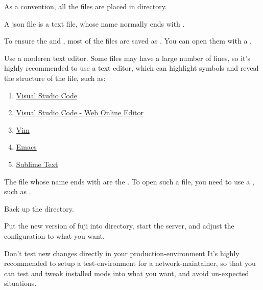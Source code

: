 \label{ch:q&a}


As a convention, all the files are placed in  directory.


A json file is a text file, whose name normally ends with .


To ensure the  and , most of the files are saved as .
You can open them with a .

\begin{tips}{Use a moderen text editor.}
    Some files may have a large number of lines, so it's highly recommended to use a  text editor, which can highlight symbols and reveal the structure of the file, such as:
    \begin{enumerate}
        \item \href{https://code.visualstudio.com/}{Visual Studio Code}
        \item \href{https://vscode.dev/}{Visual Studio Code - Web Online Editor}
        \item \href{https://www.vim.org/}{Vim}
        \item \href{https://www.gnu.org/software/emacs/}{Emacs}
        \item \href{https://www.sublimetext.com/}{Sublime Text}
    \end{enumerate}
\end{tips}


The file whose name ends with  are the .
To open such a file, you need to use a , such as .



Back up the  directory.

Put the new version of fuji into  directory, start the server, and adjust the configuration to what you want.

\begin{warn}{Don't test new changes directly in your production-environment}
    It's highly recommended to setup a test-environment for a network-maintainer, so that you can test and tweak installed mods into what you want, and avoid un-expected situations.
\end{warn}


